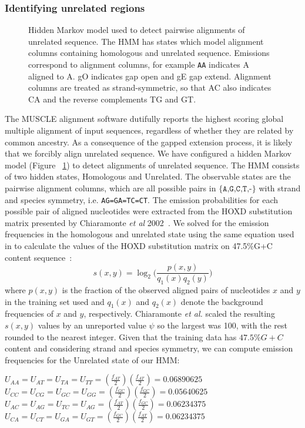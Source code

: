 \documentclass{ws-procs975x65}
\begin{document}
\subsubsection{Identifying unrelated regions}
\begin{figure}[t]
\centering {}
\caption{Hidden Markov model used to detect pairwise alignments of unrelated sequence. The HMM has states which model alignment columns containing homologous and unrelated sequence.  Emissions correspond to alignment columns, for example \texttt{AA} indicates A aligned to A.  gO indicates gap open and gE gap extend. Alignment columns are treated as strand-symmetric, so that AC also indicates CA and the reverse complements TG and GT.}
\label{fig-hmm}\vspace{-0.2cm}
\end{figure}
The MUSCLE alignment software dutifully reports the highest scoring global multiple alignment of input sequences, regardless of whether they are related by common ancestry. As a consequence of the gapped extension process, it is likely that we forcibly align unrelated sequence. We have configured a hidden Markov model (Figure ~\ref{fig-hmm}) to detect alignments of unrelated sequence. The HMM consists of two hidden states, Homologous and Unrelated. The observable states are the pairwise alignment columns, which are all possible pairs in $\texttt{{\{A,G,C,T,-\}}}$ with strand and species symmetry, i.e. \texttt{AG=GA=TC=CT}.  The emission probabilities for each possible pair of aligned nucleotides were extracted from the HOXD substitution matrix presented by Chiaramonte \textit{et al} 2002~\cite{hoxd}. We solved for the emission frequencies in the homologous and unrelated state using the same equation used in to calculate the values of the HOXD substitution matrix on 47.5\%G+C content sequence~\cite{hoxd}:
\begin{equation}
s(x,y)= \log_{2}{\Bigg(\frac{p(x,y)}{q_{1}(x)q_{2}(y)}\Bigg)}
\end{equation}
where $p(x,y)$ is the fraction of the observed aligned pairs of nucleotides $x$ and $y$ in the training set used and $q_{1}(x)$ and $q_{2}(x)$ denote the background frequencies of $x$ and $y$, respectively. Chiaramonte \textit{et al.} scaled the resulting $s(x,y)$ values by an unreported value $\psi$ so the largest was 100, with the rest rounded to the nearest integer.  Given that the training data has $47.5\%G+C$ content and considering strand and species symmetry, we can compute emission frequencies for the Unrelated state of our HMM: \begin{center}$U_{AA}=U_{AT}=U_{TA}=U_{TT}=(\frac{f_{AT}}{2})(\frac{f_{AT}}{2}) = 0.06890625$ \\
$U_{CC}=U_{CG}=U_{GC}=U_{GG}=(\frac{f_{GC}}{2})(\frac{f_{GC}}{2}) = 0.05640625$ \\
$U_{AC}=U_{AG}=U_{TC}=U_{AG}=(\frac{f_{AT}}{2})(\frac{f_{GC}}{2}) = 0.06234375$ \\
$U_{CA}=U_{CT}=U_{GA}=U_{GT}=(\frac{f_{GC}}{2})(\frac{f_{AT}}{2}) = 0.06234375$ \\
\end{center}
\end{document}
